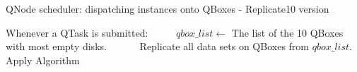 
\begin{algorithm} %
    \caption{QNode scheduler: dispatching instances onto QBoxes - Replicate10 version}
    \label{alg:10ReplicateSched}
        \begin{algorithmic}[4]
            \STATE Whenever a QTask is submitted:
        \STATE ~~~~~$qbox\_list \leftarrow$ The list of the 10 QBoxes with most empty disks.
        \STATE ~~~~~~Replicate all data sets on QBoxes from $qbox\_list$.
        \STATE Apply Algorithm 
        \end{algorithmic}
\end{algorithm}








